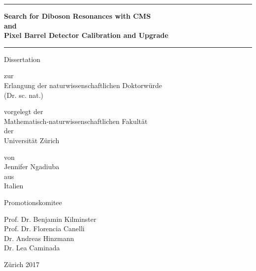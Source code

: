 

\begin{center}

  \thispagestyle{empty}
  {\parindent0cm
   \rule{\linewidth}{.3ex}}
  \begin{center}

    \bfseries\LARGE
    Search for Diboson Resonances with CMS\\ 
    and\\ 
    Pixel Barrel Detector 
    Calibration and Upgrade
  \end{center}
  \rule{\linewidth}{.3ex}

\par
\vspace{0.6 in}

{\LARGE Dissertation}
\vspace{0.1in}

zur \\
Erlangung der 
naturwissenschaftlichen Doktorw\"urde \\
(Dr. sc. nat.) \\
\par
\vspace{0.6in}


vorgelegt der\\
Mathematisch-naturwissenschaftlichen Fakult\"at \\
der \\
\vspace{0.05in}
{\LARGE Universit\"at Z\"urich}
\par
\vspace{0.3in}


\vspace{0.3in}
von \\
\vspace{0.05in}
{\LARGE Jennifer Ngadiuba} \\
aus \\
Italien \\
\par
\vspace{0.6in}


Promotionskomitee \\
\par
\vspace{0.1in}


Prof. Dr. Benjamin Kilminster\\
Prof. Dr. Florencia Canelli\\
Dr. Andreas Hinzmann\\
Dr. Lea Caminada\\

\par
\vspace{0.6in}


Z\"urich 2017

\end{center}
